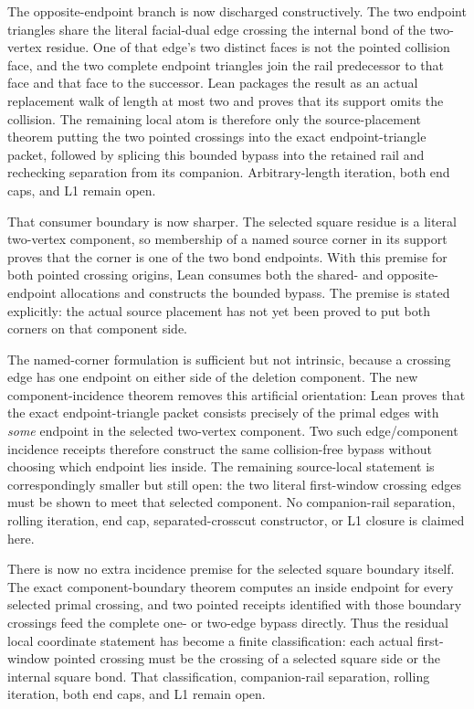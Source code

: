 \documentclass[11pt]{article}
\theoremstyle{definition}
\begin{document}
The opposite-endpoint branch is now discharged constructively.  The two
endpoint triangles share the literal facial-dual edge crossing the internal
bond of the two-vertex residue.  One of that edge's two distinct faces is not
the pointed collision face, and the two complete endpoint triangles join the
rail predecessor to that face and that face to the successor.  Lean packages
the result as an actual replacement walk of length at most two and proves that
its support omits the collision.  The remaining local atom is therefore only
the source-placement theorem putting the two pointed crossings into the exact
endpoint-triangle packet, followed by splicing this bounded bypass into the
retained rail and rechecking separation from its companion.  Arbitrary-length
iteration, both end caps, and L1 remain open.

That consumer boundary is now sharper.  The selected square residue is a
literal two-vertex component, so membership of a named source corner in its
support proves that the corner is one of the two bond endpoints.  With this
premise for both pointed crossing origins, Lean consumes both the shared- and
opposite-endpoint allocations and constructs the bounded bypass.  The premise
is stated explicitly: the actual source placement has not yet been proved to
put both corners on that component side.

The named-corner formulation is sufficient but not intrinsic, because a
crossing edge has one endpoint on either side of the deletion component.
The new component-incidence theorem removes this artificial orientation:
Lean proves that the exact endpoint-triangle packet consists precisely of the
primal edges with \emph{some} endpoint in the selected two-vertex component.
Two such edge/component incidence receipts therefore construct the same
collision-free bypass without choosing which endpoint lies inside.  The
remaining source-local statement is correspondingly smaller but still open:
the two literal first-window crossing edges must be shown to meet that selected
component.  No companion-rail separation, rolling iteration, end cap,
separated-crosscut constructor, or L1 closure is claimed here.

There is now no extra incidence premise for the selected square boundary
itself.  The exact component-boundary theorem computes an inside endpoint for
every selected primal crossing, and two pointed receipts identified with
those boundary crossings feed the complete one- or two-edge bypass directly.
Thus the residual local coordinate statement has become a finite
classification: each actual first-window pointed crossing must be the crossing
of a selected square side or the internal square bond.  That classification,
companion-rail separation, rolling iteration, both end caps, and L1 remain
open.
\end{document}
